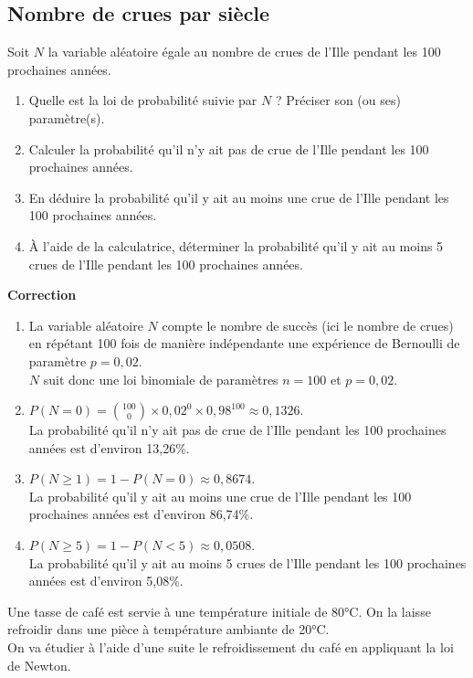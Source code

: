\documentclass[a4paper,11pt,exos]{nsi} %
\begin{document}
\subsection*{Nombre de crues par siècle}
Soit $N$ la variable aléatoire égale au nombre de crues de l'Ille pendant les 100 prochaines années.
\begin{enumerate}
    \item Quelle est la loi de probabilité suivie par $N$ ? Préciser son (ou ses) paramètre(s).
    \item Calculer la probabilité qu'il n'y ait pas de crue de l'Ille pendant les 100 prochaines années.
    \item En déduire la probabilité qu'il y ait au moins une crue de l'Ille pendant les 100 prochaines années.
    \item À l'aide de la calculatrice, déterminer la probabilité qu'il y ait au moins 5 crues de l'Ille pendant les 100 prochaines années.
\end{enumerate}

\textcolor{UGLiBlue}{\textbf{Correction}
\begin{enumerate}
    \item La variable aléatoire $N$ compte le nombre de succès (ici le nombre de crues) en répétant 100 fois de manière indépendante une expérience de Bernoulli de paramètre $p=0,02$.\\
    $N$ suit donc une loi binomiale de paramètres $n=100$ et $p=0,02$.
    \item $P(N=0)=\binom{100}{0}\times 0,02^0\times 0,98^{100}\approx 0,1326$.\\
    La probabilité qu'il n'y ait pas de crue de l'Ille pendant les 100 prochaines années est d'environ 13,26\%.
    \item $P(N\geqslant 1)=1-P(N=0)\approx 0,8674$.\\
    La probabilité qu'il y ait au moins une crue de l'Ille pendant les 100 prochaines années est d'environ 86,74\%.
    \item $P(N\geqslant 5)=1-P(N<5)\approx 0,0508$.\\
    La probabilité qu'il y ait au moins 5 crues de l'Ille pendant les 100 prochaines années est d'environ 5,08\%.
\end{enumerate}
}

Une tasse de café est servie à une température initiale de 80°C. On la laisse refroidir dans une pièce à température ambiante de 20°C.\\
On va étudier à l'aide d'une suite le refroidissement du café en appliquant la loi de Newton.\\
\end{document}
